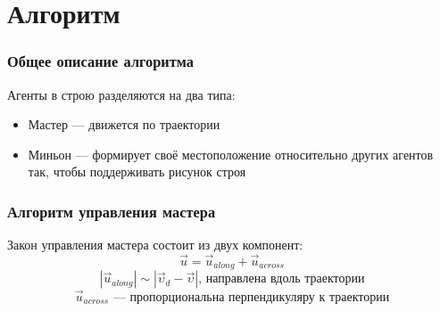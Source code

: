 \documentclass[10pt]{beamer}
\begin{document}
\section{Алгоритм}
\begin{frame}
	\frametitle{Общее описание алгоритма}
	Агенты в строю разделяются на два типа:
	\begin{itemize}
		\item Мастер — движется по траектории
		\item Миньон — формирует своё местоположение относительно других агентов так, чтобы поддерживать рисунок строя
	\end{itemize}
\end{frame}
\begin{frame}
	\frametitle{Алгоритм управления мастера}
	Закон управления мастера состоит из двух компонент:
	$$ \vec{u} = \vec{u}_{along} + \vec{u}_{across} $$
	$$  |\vec{u}_{along}| \sim |\vec{\upsilon}_{d} - \vec{\upsilon}| \text{, направлена вдоль траектории} $$
	$$  \vec{u}_{across} \text{ — пропорциональна перпендикуляру к траектории} $$
	

\end{frame}
\end{document}
